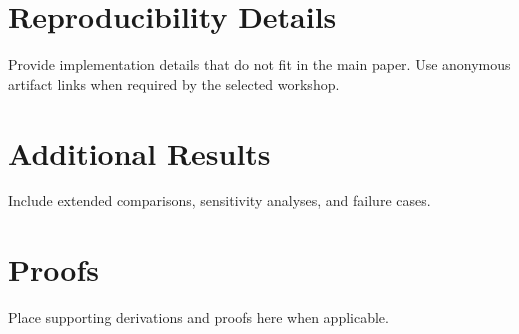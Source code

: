\section{Reproducibility Details}
\label{app:reproducibility}
Provide implementation details that do not fit in the main paper.
Use anonymous artifact links when required by the selected workshop.

\section{Additional Results}
Include extended comparisons, sensitivity analyses, and failure cases.

\section{Proofs}
Place supporting derivations and proofs here when applicable.
